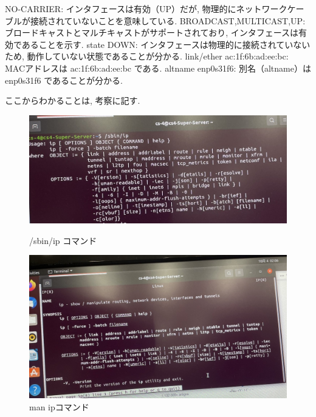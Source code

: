 \documentclass{ltjsarticle} %
\begin{document}
NO-CARRIER: インタフェースは有効（UP）だが, 物理的にネットワークケーブルが接続されていないことを意味している.
BROADCAST,MULTICAST,UP: ブロードキャストとマルチキャストがサポートされており, インタフェースは有効であることを示す.
state DOWN: インタフェースは物理的に接続されていないため, 動作していない状態であることが分かる.
link/ether ac:1f:6b:ad:ee:bc: MACアドレスは ac:1f:6b:ad:ee:bc である.
altname enp0s31f6: 別名（altname）は enp0s31f6 であることが分かる.

ここからわかることは, 考察に記す.

\begin{figure}[H] %
  \centering
  \begin{minipage}{0.45\textwidth} %
    \centering
    \includegraphics[width=\textwidth]{sbin.jpg} %
    \caption{/sbin/ip コマンド} %
    \label{fig:sbin} %
  \end{minipage}
  \hfill %
  \begin{minipage}{0.45\textwidth} %
    \centering
    \includegraphics[width=\textwidth]{man.jpg} %
    \caption{man ipコマンド} %
    \label{fig:man} %
  \end{minipage}
\end{figure}
\end{document}
